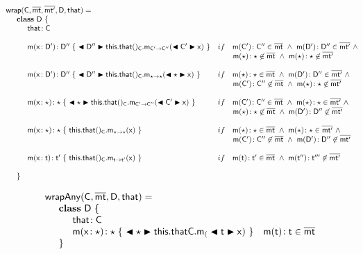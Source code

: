 \documentclass[acmlarge, anonymous, authordraft]{acmart}
\begin{document}
\vspace{4mm}
\[\begin{array}{@{}ll@{}l@{}r@{~}c@{~}r}
    \wrap\C\bmt\bmtp\D\that = \\
\SP \class ~\D ~ \{\\
\SPP \Fdef\that\C \\
\\
\SPP \Mdef\m\x\Dp\Dpp {~\bscast\Dpp{{\KCall{\this.\that()_{\C}} \m {\bscast{\Cp}\x}\Cp\Cpp }}~}
&     if\,\,\,\,\,\, \Mtype\m\Cp\Cpp\in\bmt ~\wedge~ \Mtype\m\Dp\Dpp\in\bmtp ~\wedge~ \\
&     \multicolumn{5}{l}{\qquad \Mtype\m\any\any\not\in\bmt ~\wedge~ \Mtype\m\any\any\not\in\bmtp} \\
\\
\SPP \Mdef\m\x\Dp\Dpp{~\bscast\Dpp{\KCall{\this.\that()_{\C}} \m {\bscast\any\x}\any\any }~}
&    if\,\,\,\,\,\, \Mtype\m\any\any\in\bmt ~\wedge~ \Mtype\m\Dp\Dpp\in\bmtp ~\wedge~  \\
&     \multicolumn{5}{l}{\qquad \Mtype\m\Cp\Cpp\not\in\bmt ~\wedge~  \Mtype\m\any\any\not\in\bmtp } \\
\\
\SPP \Mdef\m\x\any\any{~\bscast\any{\KCall{\this.\that()_{\C}}\m{\bscast{\Cp}\x}\Cp\Cpp}~}
&    if\,\,\,\,\,\, \Mtype\m\Cp\Cpp\in\bmt ~\wedge~ \Mtype\m\any\any\in\bmtp ~\wedge~   \\
&     \multicolumn{5}{l}{\qquad \Mtype\m\any\any\not\in\bmt ~\wedge~  \Mtype\m\Dp\Dpp\not\in\bmtp } \\
\\
\SPP \Mdef\m\x\any\any{~{\KCall{\this.\that()_{\C}}\m{\x}\any\any}~}
&    if\,\,\,\,\,\, \Mtype\m\any\any\in\bmt ~\wedge~ \Mtype\m\any\any\in\bmtp ~\wedge~ \\
&     \multicolumn{5}{l}{\qquad \Mtype\m\Cp\Cpp\not\in\bmt ~\wedge~ \Mtype\m\Dp\Dpp\not\in\bmtp} \\
\\
\SPP \Mdef\m\x{\t}{\tp}{~\KCall{\this.\that()_{\C}}\m{\x}\t\tp~}
&    if\,\,\,\,\,\, \Mtype\m\t\tp\in\bmt ~\wedge~ \Mtype\m\tpp\tppp\not\in \bmtp \\
\\
\SP \}
\\
\end{array}\]

\[\begin{array}{@{}ll@{}l@{}r@{~}c@{~}r}
\wrapAny\C\bmt\D\that = \\
\SP \class~\D~\{\\
\SPP \Fdef \that \C\\ 
\SPP   \Mdef\m\x\any\any {~\bscast\any{\Call{\FRead\that\C}{\m_}{\bscast{\t}\x} }~}
&  \Mtype\m\t\t\in\b\mt \\
\SP \}\\
\end{array}\]
\end{document}
